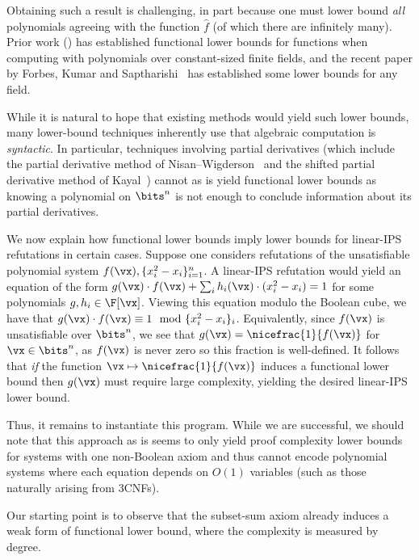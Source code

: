 \documentclass[11pt]{article}
\numberwithin{equation}{section}
\theoremstyle{definition}
\theoremstyle{plain}
\begin{document}
Obtaining such a result is challenging, in part because one must lower bound \emph{all} polynomials agreeing with the function $\hat{f}$ (of which there are infinitely many).  Prior work %
%
(\cite{GrigorievKarpinski98,GrigorievRazborov00,KumarSaptharishi15}) has established functional lower bounds for functions when computing with polynomials over constant-sized finite fields, and the recent %
paper by  %
Forbes, Kumar and Saptharishi~\cite{ForbesKS16} has established some lower bounds for any field.

While it is natural to hope that existing methods would yield such lower bounds, many %
lower-bound  %
techniques inherently use that algebraic computation is \emph{syntactic}.  In particular, techniques involving partial derivatives (which include the partial derivative method of Nisan--Wigderson~\cite{NisanWigderson96} and the shifted partial derivative method of Kayal~\cite{Kayal12,GuptaKKS14}) cannot as is yield functional lower bounds as
knowing a polynomial on $\bits^n$ is not enough  to conclude information about its partial derivatives.

We now explain how functional lower bounds imply lower bounds for linear-IPS refutations in certain cases.  Suppose one considers refutations of the unsatisfiable polynomial system $f(\vx),\{x_i^2-x_i\}_{i=1}^n$.  A linear-IPS refutation would yield an equation of the form $g(\vx)\cdot f(\vx)+\sum_i h_i(\vx)\cdot (x_i^2-x_i)=1$ for some polynomials $g,h_i\in\F[\vx]$.  Viewing this equation modulo the Boolean cube, we have that $g(\vx)\cdot f(\vx)\equiv 1\mod \{x_i^2-x_i\}_i$.  Equivalently, since $f(\vx)$ is unsatisfiable over $\bits^n$, we see that $g(\vx)=\nicefrac{1}{f(\vx)}$ for $\vx\in\bits^n$, as $f(\vx)$ is never zero so this fraction is well-defined.  It follows that \emph{if} the function $\vx\mapsto \nicefrac{1}{f(\vx)}$ induces a functional lower bound then $g(\vx)$ must require large complexity, yielding the desired linear-IPS lower bound.

Thus, it remains to instantiate this program.  While we are successful, we should note that this approach as is seems to only yield proof complexity lower bounds for systems with one non-Boolean axiom and thus cannot encode polynomial systems where each equation depends on $O(1)$ variables (such as those naturally arising from 3CNFs).

Our starting point is to observe that the subset-sum axiom already induces a weak form of functional lower bound, where the complexity is measured by degree.
\end{document}
